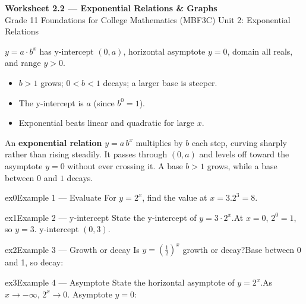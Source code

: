 \documentclass[11pt]{article}
\begin{document}
\begin{center}
{\LARGE\bfseries\color{titleblue}Worksheet 2.2 --- Exponential Relations \& Graphs}\\[2pt]
{\small Grade 11 Foundations for College Mathematics (MBF3C) \textperiodcentered{} Unit 2: Exponential Relations}
\end{center}

\begin{ideabox}
$y=a\cdot b^x$ has y-intercept $(0,a)$, horizontal asymptote $y=0$, domain all reals, and range $y>0$.
\begin{itemize}[leftmargin=*,itemsep=2pt]
  \item $b>1$ grows; $0<b<1$ decays; a larger base is steeper.
  \item The y-intercept is $a$ (since $b^0=1$).
  \item Exponential beats linear and quadratic for large $x$.
\end{itemize}
\end{ideabox}

\begin{learnbox}
An \textbf{exponential relation} $y=a\,b^x$ multiplies by $b$ each step, curving sharply rather than rising steadily.
It passes through $(0,a)$ and levels off toward the asymptote $y=0$ without ever crossing it.
A base $b>1$ grows, while a base between $0$ and $1$ decays.
\end{learnbox}


\begin{example}{ex0}{Example 1 --- Evaluate}
For $y=2^x$, find the value at $x=3$.\soln $2^3=8$.
\end{example}

\begin{example}{ex1}{Example 2 --- y-intercept}
State the y-intercept of $y=3\cdot2^x$.\soln At $x=0$, $2^0=1$, so $y=3$. y-intercept $(0,3)$.
\end{example}

\begin{example}{ex2}{Example 3 --- Growth or decay}
Is $y=\left(\tfrac12\right)^x$ growth or decay?\soln Base between 0 and 1, so decay:
\end{example}

\begin{example}{ex3}{Example 4 --- Asymptote}
State the horizontal asymptote of $y=2^x$.\soln As $x\to-\infty$, $2^x\to0$. Asymptote $y=0$:
\end{example}
\end{document}
